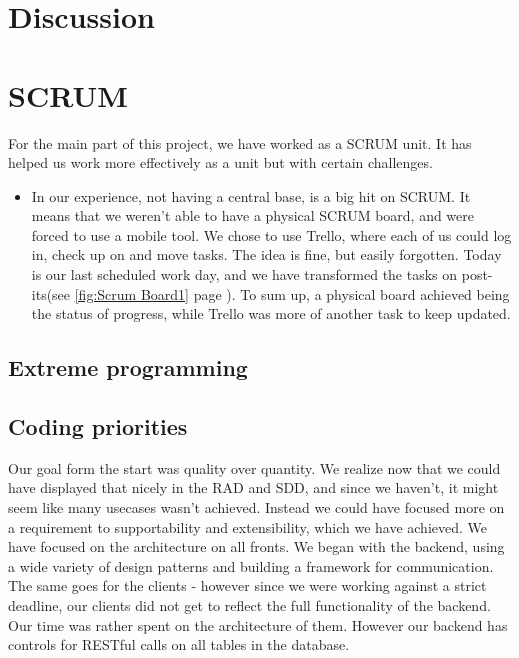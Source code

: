 \chapter{Discussion}

\chapter{SCRUM}
For the main part of this project, we have worked as a SCRUM unit. It has helped us work more effectively as a unit but with certain challenges.

\begin{itemize}
\item In our experience, not having a central base, is a big hit on SCRUM. It means that we weren't able to have a physical SCRUM board, and were forced to use a mobile tool. We chose to use Trello, where each of us could log in, check up on and move tasks. The idea is fine, but easily forgotten. Today is our last scheduled work day, and we have transformed the tasks on post-its(see \ref{fig:Scrum Board1} page \pageref{fig:Scrum Board1}). To sum up, a physical board achieved being the status of progress, while Trello was more of another task to keep updated.
\end{itemize}

\section{Extreme programming}


\section{Coding priorities}
Our goal form the start was quality over quantity. We realize now that we could have displayed that nicely in the RAD and SDD, and since we haven't, it might seem like many usecases wasn't achieved. Instead we could have focused more on a requirement to supportability and extensibility, which we have achieved.
We have focused on the architecture on all fronts. We began with the backend, using a wide variety of design patterns and building a framework for communication. The same goes for the clients - however since we were working against a strict deadline, our clients did not get to reflect the full functionality of the backend. Our time was rather spent on the architecture of them. However our backend has controls for RESTful calls on all tables in the database. 
